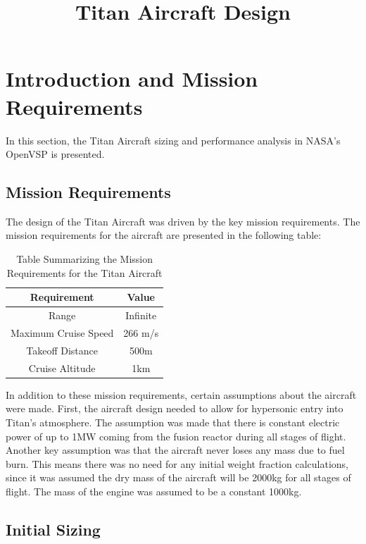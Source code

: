 \documentclass{article}
\title{Titan Aircraft Design}
\begin{document}
\maketitle

\section{Introduction and Mission Requirements}
\label{sec:Titan Aircraft Design}

In this section, the Titan Aircraft sizing and performance analysis in NASA's OpenVSP is presented. 

\subsection{Mission Requirements}
\label{sec:Mission Requirements}

The design of the Titan Aircraft was driven by the key mission requirements. The mission requirements for the aircraft are presented in the following table:

\begin{table}[H]
\centering
\begin{tabular}{|c|c|} 
\textbf{Requirement} & \textbf{Value} \\
\hline 
\hline
    Range & Infinite \\
\hline 
    Maximum Cruise Speed & 266 m/s\\
\hline 
    Takeoff Distance & 500m\\
\hline 
    Cruise Altitude & 1km\\
    \end{tabular}
    \caption[Table] {Table Summarizing the Mission Requirements for the Titan Aircraft}
\label{tab:parameters}
\end{table}


In addition to these mission requirements, certain assumptions about the aircraft were made. First, the aircraft design needed to allow for hypersonic entry into Titan's atmosphere. The assumption was made that there is constant electric power of up to 1MW coming from the fusion reactor during all stages of flight. Another key assumption was that the aircraft never loses any mass due to fuel burn. This means there was no need for any initial weight fraction calculations, since it was assumed the dry mass of the aircraft will be 2000kg for all stages of flight. The mass of the engine was assumed to be a constant 1000kg. 

\subsection{Initial Sizing}
\label{sec:initial sizing}
\end{document}
